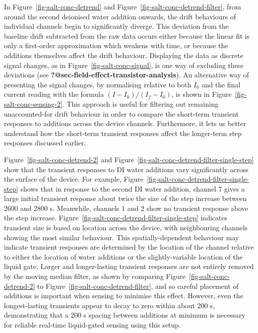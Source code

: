 \documentclass[
  a4paper,
]{scrbook}
\begin{document}
In Figure~\ref{fig-salt-conc-detrend} and
Figure~\ref{fig-salt-conc-detrend-filter}, from around the second
deionised water addition onwards, the drift behaviours of individual
channels begin to significantly diverge. This deviation from the
baseline drift subtracted from the raw data occurs either because the
linear fit is only a first-order approximation which weakens with time,
or because the additions themselves affect the drift behaviour.
Displaying the data as discrete signal changes, as in
Figure~\ref{fig-salt-conc-signal}, is one way of excluding these
deviations (see \textbf{?@sec-field-effect-transistor-analysis}). An
alternative way of presenting the signal changes, by normalising
relative to both \(I_{0}\) and the final current reading with the
formula \((I - I_{0})/(I_{f} - I_{0})\), is shown in
Figure~\ref{fig-salt-conc-sensing-2}. This approach is useful for
filtering out remaining unaccounted-for drift behaviour in order to
compare the short-term transient responses to additions across the
device channels. Furthermore, it lets us better understand how the
short-term transient responses affect the longer-term step responses
discussed earlier.

Figure~\ref{fig-salt-conc-detrend-2} and
Figure~\ref{fig-salt-conc-detrend-filter-single-step} show that the
transient responses to DI water additions vary significantly across the
surface of the device. For example,
Figure~\ref{fig-salt-conc-detrend-filter-single-step} shows that in
response to the second DI water addition, channel 7 gives a large
initial transient response about twice the size of the step increase
between 2600 and 2800 s. Meanwhile, channels 1 and 2 show no transient
response above the step increase.
Figure~\ref{fig-salt-conc-detrend-filter-single-step} indicates
transient size is based on location across the device, with neighbouring
channels showing the most similar behaviour. This spatially-dependent
behaviour may indicate transient responses are determined by the
location of the channel relative to either the location of water
additions or the slightly-variable location of the liquid gate. Larger
and longer-lasting transient responses are not entirely removed by the
moving median filter, as shown by comparing
Figure~\ref{fig-salt-conc-detrend-2} to
Figure~\ref{fig-salt-conc-detrend-filter}, and so careful placement of
additions is important when sensing to minimise this effect. However,
even the longest-lasting transients appear to decay to zero within about
200 s, demonstrating that a 200 s spacing between additions at minimum
is necessary for reliable real-time liquid-gated sensing using this
setup.
\end{document}
